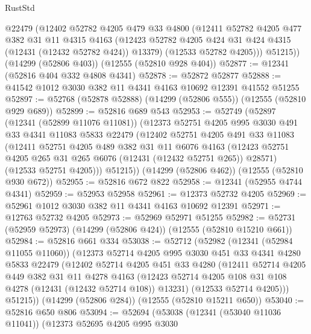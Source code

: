 \begin{lexlean}{RustStd}
\begin{coremodule}
        @22479
        (@12402
          @52782
          @4205
          @479
          @33
          @4800
          (@12411
            @52782
            @4205
            @477
            @382
            @31
            @11
            @4315
            @4163
            (@12423 @52782 @4205 @424 @31 @424 @4315 (@12431 (@12432 @52782 @424)) @13379)
            (@12533 @52782 @4205)))
        @51215))
    (@14299 (@52806 @403))
    (@12555 (@52810 @928 @404))
@52877 := @12341 (@52816 @404 @332 @4808 @4341)
@52878 := @52872 @52877
@52888 := @41542 @1012 @3030 @382 @11 @4341 @4163 @10692 @12391 @41552 @51255
@52897 := @52768 (@52878 @52888) (@14299 (@52806 @555)) (@12555 (@52810 @929 @689))
@52899 := @52816 @689 @543
@52953 := @52749
    (@52897
      (@12341 (@52899 @11076 @11081))
      (@12373
        @52751
        @4205
        @995
        @3030
        @491
        @33
        @4341
        @11083
        @5833
        @22479
        (@12402
          @52751
          @4205
          @491
          @33
          @11083
          (@12411
            @52751
            @4205
            @489
            @382
            @31
            @11
            @6076
            @4163
            (@12423 @52751 @4205 @265 @31 @265 @6076 (@12431 (@12432 @52751 @265)) @28571)
            (@12533 @52751 @4205)))
        @51215))
    (@14299 (@52806 @462))
    (@12555 (@52810 @930 @672))
@52955 := @52816 @672 @822
@52958 := @12341 (@52955 @4744 @4341)
@52959 := @52953 @52958
@52961 := @12373 @52732 @4205
@52969 := @52961 @1012 @3030 @382 @11 @4341 @4163 @10692 @12391
@52971 := @12763 @52732 @4205
@52973 := @52969 @52971 @51255
@52982 := @52731 (@52959 @52973) (@14299 (@52806 @424)) (@12555 (@52810 @15210 @661))
@52984 := @52816 @661 @334
@53038 := @52712
    (@52982
      (@12341 (@52984 @11055 @11060))
      (@12373
        @52714
        @4205
        @995
        @3030
        @451
        @33
        @4341
        @4280
        @5833
        @22479
        (@12402
          @52714
          @4205
          @451
          @33
          @4280
          (@12411
            @52714
            @4205
            @449
            @382
            @31
            @11
            @4278
            @4163
            (@12423 @52714 @4205 @108 @31 @108 @4278 (@12431 (@12432 @52714 @108)) @13231)
            (@12533 @52714 @4205)))
        @51215))
    (@14299 (@52806 @284))
    (@12555 (@52810 @15211 @650))
@53040 := @52816 @650 @806
@53094 := @52694
    (@53038
      (@12341 (@53040 @11036 @11041))
      (@12373
        @52695
        @4205
        @995
        @3030

\end{coremodule}
\end{lexlean}
